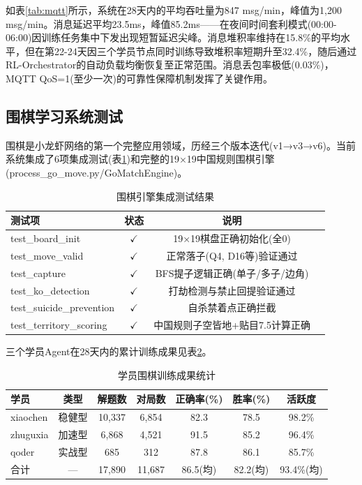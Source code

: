 \documentclass[12pt,a4paper]{ctexart}
\begin{document}
如表\ref{tab:mqtt}所示，系统在28天内的平均吞吐量为847 msg/min，峰值为1,200 msg/min。消息延迟平均23.5ms，峰值85.2ms——在夜间时间套利模式(00:00-06:00)因训练任务集中下发出现短暂延迟尖峰。消息堆积率维持在15.8\%的平均水平，但在第22-24天因三个学员节点同时训练导致堆积率短期升至32.4\%，随后通过RL-Orchestrator的自动负载均衡恢复至正常范围。消息丢包率极低(0.03\%)，MQTT QoS=1(至少一次)的可靠性保障机制发挥了关键作用。

\subsection{围棋学习系统测试}

围棋是小龙虾网络的第一个完整应用领域，历经三个版本迭代(v1→v3→v6)。当前系统集成了6项集成测试(表\ref{tab:go_tests})和完整的19×19中国规则围棋引擎(process\_go\_move.py/GoMatchEngine)。

\begin{table}[H]
\centering
\caption{围棋引擎集成测试结果}
\label{tab:go_tests}
\begin{tabular}{lccc}
\toprule
测试项 & 状态 & 说明 \\
\midrule
test\_board\_init & $\checkmark$ & 19×19棋盘正确初始化(全0) \\
test\_move\_valid & $\checkmark$ & 正常落子(Q4, D16等)验证通过 \\
test\_capture & $\checkmark$ & BFS提子逻辑正确(单子/多子/边角) \\
test\_ko\_detection & $\checkmark$ & 打劫检测与禁止回提验证通过 \\
test\_suicide\_prevention & $\checkmark$ & 自杀禁着点正确拦截 \\
test\_territory\_scoring & $\checkmark$ & 中国规则子空皆地+贴目7.5计算正确 \\
\bottomrule
\end{tabular}
\end{table}

三个学员Agent在28天内的累计训练成果见表\ref{tab:go_results}。

\begin{table}[H]
\centering
\caption{学员围棋训练成果统计}
\label{tab:go_results}
\begin{tabular}{lcccccc}
\toprule
学员 & 类型 & 解题数 & 对局数 & 正确率(\%) & 胜率(\%) & 活跃度 \\
\midrule
xiaochen & 稳健型 & 10,337 & 6,854 & 82.3 & 78.5 & 98.2\% \\
zhuguxia & 加速型 & 6,868 & 4,521 & 91.5 & 85.2 & 96.4\% \\
qoder & 实战型 & 685 & 312 & 87.8 & 86.1 & 85.7\% \\
\midrule
合计 & — & 17,890 & 11,687 & 86.5(均) & 82.2(均) & 93.4\%(均) \\
\bottomrule
\end{tabular}
\end{table}
\end{document}
